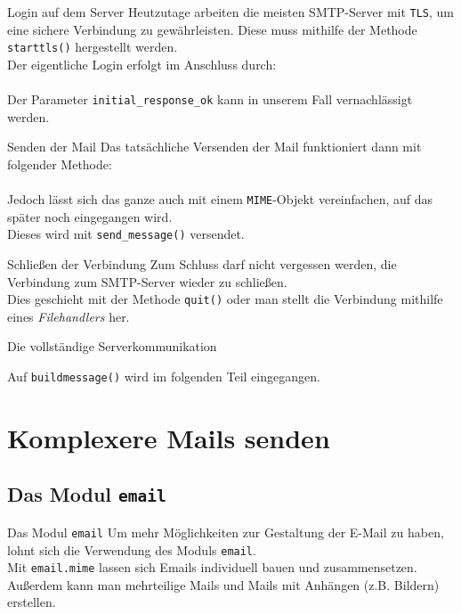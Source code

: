 \begin{frame}[fragile]{Login auf dem Server}
	Heutzutage arbeiten die meisten SMTP-Server mit \texttt{TLS}, um eine sichere Verbindung zu gewährleisten. Diese muss mithilfe der Methode \texttt{\alert{starttls()}} hergestellt werden.\\[.25cm]
	Der eigentliche Login erfolgt im Anschluss durch:\\[.25cm]
	
	\ \\[.25cm]
	Der Parameter \texttt{initial\_response\_ok} kann in unserem Fall vernachlässigt werden.
\end{frame}

\begin{frame}[fragile]{Senden der Mail}
	Das tatsächliche Versenden der Mail funktioniert dann mit folgender Methode:\\[.25cm]
	
	\ \\[.25cm]
	Jedoch l\"asst sich das ganze auch mit einem \texttt{MIME}-Objekt vereinfachen, auf das später noch eingegangen wird. \\
	Dieses wird mit \texttt{\alert{send\_message()}} versendet.
\end{frame}

\begin{frame}{Schließen der Verbindung}
	Zum Schluss darf nicht vergessen werden, die Verbindung zum SMTP-Server wieder zu schließen.\\
	Dies geschieht mit der Methode \texttt{\alert{quit()}} oder man stellt die Verbindung mithilfe eines \textit{Filehandlers} her.
\end{frame}

\begin{frame}[fragile]{Die vollst\"andige Serverkommunikation}
	
	Auf \texttt{buildmessage()} wird im folgenden Teil eingegangen.
\end{frame}

\section{Komplexere Mails senden}
\subsection{Das Modul \texttt{email}}
\begin{frame}[fragile]{Das Modul \texttt{email}}
	Um mehr Möglichkeiten zur Gestaltung der E-Mail zu haben, lohnt sich die Verwendung des Moduls \texttt{email}.\\[.5cm]
	Mit \texttt{\alert{email.mime}} lassen sich Emails individuell bauen und zusammensetzen. Außerdem kann man mehrteilige Mails und Mails mit Anhängen (z.B. Bildern) erstellen.
\end{frame}

